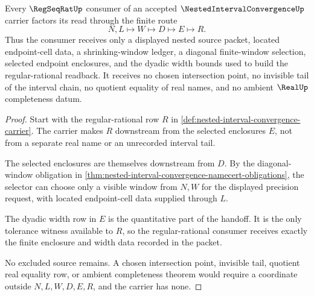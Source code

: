 \begin{theorem}
\label{thm:nested-interval-convergence-regseqrat-handoff}
Every $\RegSeqRatUp$ consumer of an accepted $\NestedIntervalConvergenceUp$ carrier factors its read through the finite route
$$
N,L \longmapsto W \longmapsto D \longmapsto E \longmapsto R .
$$
Thus the consumer receives only a displayed nested source packet, located endpoint-cell data, a shrinking-window ledger, a diagonal finite-window selection, selected endpoint enclosures, and the dyadic width bounds used to build the regular-rational readback. It receives no chosen intersection point, no invisible tail of the interval chain, no quotient equality of real names, and no ambient $\RealUp$ completeness datum.
\end{theorem}
\begin{proof}
Start with the regular-rational row $R$ in \autoref{def:nested-interval-convergence-carrier}. The carrier makes $R$ downstream from the selected enclosures $E$, not from a separate real name or an unrecorded interval tail.

The selected enclosures are themselves downstream from $D$. By the diagonal-window obligation in \autoref{thm:nested-interval-convergence-namecert-obligations}, the selector can choose only a visible window from $N,W$ for the displayed precision request, with located endpoint-cell data supplied through $L$.

The dyadic width row in $E$ is the quantitative part of the handoff. It is the only tolerance witness available to $R$, so the regular-rational consumer receives exactly the finite enclosure and width data recorded in the packet.

No excluded source remains. A chosen intersection point, invisible tail, quotient real equality row, or ambient completeness theorem would require a coordinate outside $N,L,W,D,E,R$, and the carrier has none.
\end{proof}

